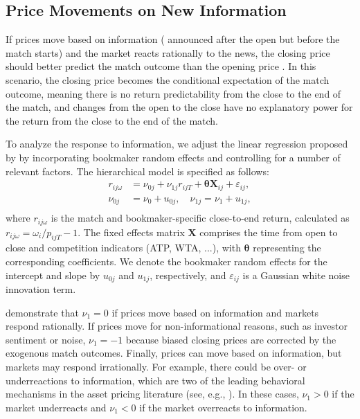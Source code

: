 \documentclass[webpdf,modern,medium]{oup-authoring-template}
\newcommand{\bs}{\boldsymbol}
\theoremstyle{thmstyleone}%
\theoremstyle{thmstyletwo}%
\theoremstyle{thmstylethree}%
\begin{document}
    \subsection{Price Movements on New Information}

If prices move based on information (%
announced after the open but before the match starts) and the market reacts rationally to the news, the closing price should better predict the match outcome than the opening price \citep{moskowitz2021}. In this scenario, the closing price becomes the conditional expectation of the match outcome, meaning there is no return predictability from the close to the end of the match, and changes from the open to the close have no explanatory power for the return from the close to the end of the match.

To analyze the response to information, we adjust the linear regression proposed by \citet{moskowitz2021} by incorporating bookmaker random effects and controlling for a number of relevant factors. The hierarchical model is specified as follows:
        \begin{equation}
            \begin{split}
                r_{ij\omega} &= \nu_{0j} + \nu_{1j} r_{ijT} + \bs{\theta} \bs{X}_{ij} + \varepsilon_{ij}, \\
                \nu_{0j} &= \nu_{0} + u_{0j},\quad \nu_{1j} = \nu_{1} + u_{1j}, \\
            \end{split}
        \label{eq:resp_to_info}
        \end{equation}
        where $r_{ij\omega}$ is the match and bookmaker-specific close-to-end return, calculated as $r_{ij\omega} = \omega_i / p_{ijT} - 1$. The fixed effects matrix $\bs{X}$ comprises the time from open to close and competition indicators (ATP, WTA, ...), with $\bs{\theta}$ representing the corresponding coefficients. We denote the bookmaker random effects for the intercept and slope by $u_{0j}$ and $u_{1j}$, respectively, and $\varepsilon_{ij}$ is a Gaussian white noise innovation term.

        \citet{moskowitz2021} demonstrate that $\nu_1 = 0$ if prices move based on information and markets respond rationally. If prices move for non-informational reasons, such as investor sentiment or noise, $\nu_1 = -1$ because biased closing prices are corrected by the exogenous match outcomes.
        Finally, prices can move based on information, but markets may respond irrationally. For example, there could be over- or underreactions to information, which are two of the leading behavioral mechanisms in the asset pricing literature (see, e.g., \citet{barberis1998, daniel1998, moskowitz2021}). In these cases, $\nu_1 > 0$ if the market underreacts and $\nu_1 < 0$ if the market overreacts to information.
\end{document}
